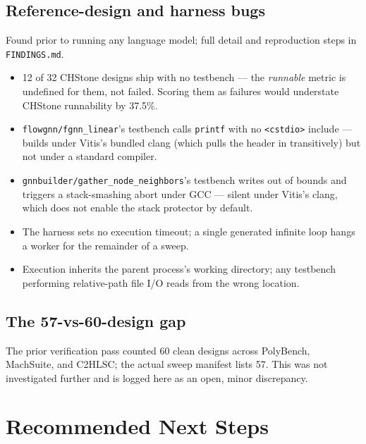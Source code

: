 \documentclass[11pt]{article}
\newcommand{\code}[1]{\texttt{#1}}
\begin{document}
\subsection{Reference-design and harness bugs}

Found prior to running any language model; full detail and reproduction
steps in \code{FINDINGS.md}.

\begin{itemize}[leftmargin=*]
\item 12 of 32 CHStone designs ship with no testbench --- the
\emph{runnable} metric is undefined for them, not failed. Scoring them
as failures would understate CHStone runnability by 37.5\%.
\item \code{flowgnn/fgnn\_linear}'s testbench calls \code{printf} with
no \code{<cstdio>} include --- builds under Vitis's bundled clang
(which pulls the header in transitively) but not under a standard
compiler.
\item \code{gnnbuilder/gather\_node\_neighbors}'s testbench writes out
of bounds and triggers a stack-smashing abort under GCC --- silent
under Vitis's clang, which does not enable the stack protector by
default.
\item The harness sets no execution timeout; a single generated
infinite loop hangs a worker for the remainder of a sweep.
\item Execution inherits the parent process's working directory; any
testbench performing relative-path file I/O reads from the wrong
location.
\end{itemize}

\subsection{The 57-vs-60-design gap}

The prior verification pass counted 60 clean designs across PolyBench,
MachSuite, and C2HLSC; the actual sweep manifest lists 57. This was not
investigated further and is logged here as an open, minor discrepancy.

\section{Recommended Next Steps}
\end{document}
